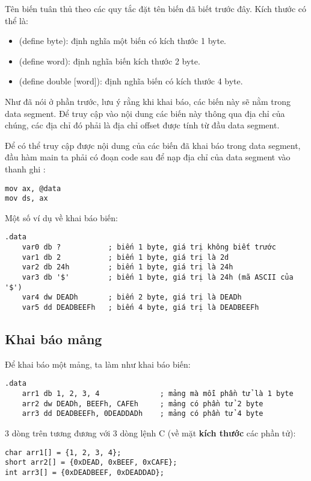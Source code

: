 \documentclass[main.tex]{subfiles}
\begin{document}
Tên biến tuân thủ theo các quy tắc đặt tên biến đã biết trước đây.
Kích thước có thể là:
\begin{itemize}
    \item {} (define byte): định nghĩa một biến có kích thước 1 byte.
    \item {} (define word): định nghĩa biến kích thước 2 byte.
    \item {} (define double [word]): định nghĩa biến có kích thước 4 byte.
\end{itemize}

Như đã nói ở phần trước, lưu ý rằng khi khai báo, các biến này sẽ nằm trong data segment. Để truy cập vào nội dung các biến này thông qua địa chỉ của chúng, các địa chỉ đó phải là địa chỉ offset được tính từ đầu data segment.

Để có thể truy cập được nội dung của các biến đã khai báo trong data segment, đầu hàm main ta phải có đoạn code sau để nạp địa chỉ của data segment vào thanh ghi :
\begin{verbatim}
mov ax, @data 
mov ds, ax
\end{verbatim}

Một số ví dụ về khai báo biến:
\begin{verbatim}
.data 
    var0 db ?           ; biến 1 byte, giá trị không biết trước
    var1 db 2           ; biến 1 byte, giá trị là 2d
    var2 db 24h         ; biến 1 byte, giá trị là 24h
    var3 db '$'         ; biến 1 byte, giá trị là 24h (mã ASCII của '$')
    var4 dw DEADh       ; biến 2 byte, giá trị là DEADh
    var5 dd DEADBEEFh   ; biến 4 byte, giá trị là DEADBEEFh
\end{verbatim}

\subsection{Khai báo mảng}
Để khai báo một mảng, ta làm như khai báo biến:
\begin{verbatim}
.data
    arr1 db 1, 2, 3, 4              ; mảng mà mỗi phần tử là 1 byte
    arr2 dw DEADh, BEEFh, CAFEh     ; mảng có phần tử 2 byte
    arr3 dd DEADBEEFh, 0DEADDADh    ; mảng có phần tử 4 byte
\end{verbatim}
3 dòng trên tương đương với 3 dòng lệnh C (về mặt \textbf{kích thước} các phần tử):
\begin{verbatim}
char arr1[] = {1, 2, 3, 4};
short arr2[] = {0xDEAD, 0xBEEF, 0xCAFE};
int arr3[] = {0xDEADBEEF, 0xDEADDAD};
\end{verbatim}
\end{document}
